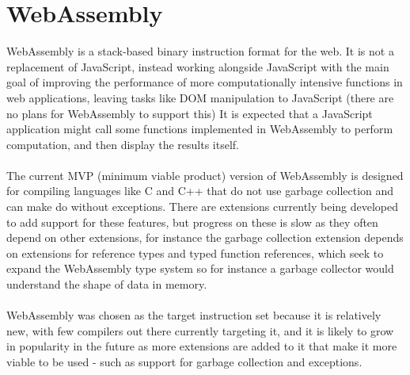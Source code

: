 \section{WebAssembly}
WebAssembly\cite{webassembly} is a stack-based binary instruction format for the web. It is not a replacement of JavaScript, instead working alongside JavaScript with the main goal of improving the performance of  more computationally intensive functions in web applications, leaving tasks like DOM manipulation to JavaScript (there are no plans for WebAssembly to support this) It  is  expected  that  a  JavaScript  application might  call  some  functions  implemented  in  WebAssembly  to  perform  computation,  and then display the results itself.
\\\\
The current MVP (minimum viable product) version of WebAssembly is designed for compiling languages like C and C++ that do not use garbage collection and can make do without exceptions. There are extensions currently being developed to add support for these features, but progress on these is slow as they often depend on other extensions, for instance the garbage collection extension depends on extensions for reference types and typed function references, which seek to expand the WebAssembly type system so for instance a garbage collector would understand the shape of data in memory\cite{Wgce}.
\\\\
WebAssembly was chosen as the target instruction set because it is relatively new, with few compilers out there currently targeting it, and it is likely to grow in popularity in the future as more extensions are added to it that make it more viable to be used - such as support for garbage collection and exceptions.


